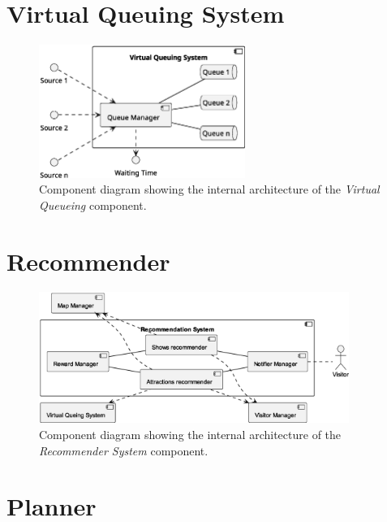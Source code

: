 \section{Virtual Queuing System}
\begin{figure}[H]
	\centering
	\includegraphics[width=0.6\textwidth]{img/virtual-queuing.eps}
	\caption{Component diagram showing the internal architecture of the \textit{Virtual Queueing} component.
	}
	\label{fig:virtual-queueing-arch}
\end{figure}

\section{Recommender}

\begin{figure}[H]
	\centering
	\includegraphics[width=0.9\textwidth]{img/recommender.eps}
	\caption{Component diagram showing the internal architecture of the \textit{Recommender System} component.
	}
	\label{fig:recommender-arch}
\end{figure}

\section{Planner}

